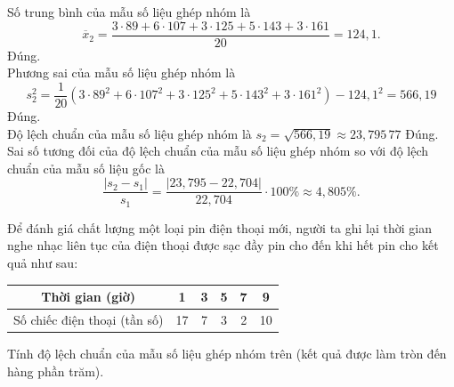 \begin{ex}
{\begin{itemchoice}
			Số trung bình của mẫu số liệu ghép nhóm là $$\overline x_2=\dfrac{3\cdot 89+6\cdot 107+3\cdot 125+5\cdot 143+3\cdot 161}{20}=124{,}1.$$
			\itemch Đúng.\\
			Phương sai của mẫu số liệu ghép nhóm là
			$$
			s_2^2=\dfrac{1}{20}\left(3\cdot 89^2+6\cdot 107^2+3\cdot 125^2+5\cdot 143^2+3\cdot 161^2\right)-124{,}1^2=566{,}19
			$$
			\itemch Đúng.\\
			Độ lệch chuẩn của mẫu số liệu ghép nhóm là $s_2=\sqrt{566{,}19}\approx 23{,}795\,77$
			\itemch Đúng.\\
			Sai số tương đối của độ lệch chuẩn của mẫu số liệu ghép nhóm so với độ lệch chuẩn của mẫu số liệu gốc là $$\dfrac{\left|s_2-s_1\right|}{s_1}=\dfrac{|23{,}795-22{,}704|}{22{,}704}\cdot 100 \% \approx 4{,}805 \%.$$
		\end{itemchoice}
	}
\end{ex}

\begin{bt}%

	Để đánh giá chất lượng một loại pin điện thoại mới, người ta ghi lại thời gian nghe nhạc liên tục của điện thoại được sạc đầy pin cho đến khi hết pin cho kết quả như sau:
	\begin{center}
		\begin{tabular}{|c|c|c|c|c|c|}
			\hline
			Thời gian (giờ) & 1 & 3 & 5 & 7 & 9\\ \hline
			Số chiếc điện thoại (tần số) & 17 & 7 & 3 & 2 & 10\\ \hline
		\end{tabular}
	\end{center}
	Tính độ lệch chuẩn của mẫu số liệu ghép nhóm trên (kết quả được làm tròn đến hàng phần trăm).
	
\end{bt}

